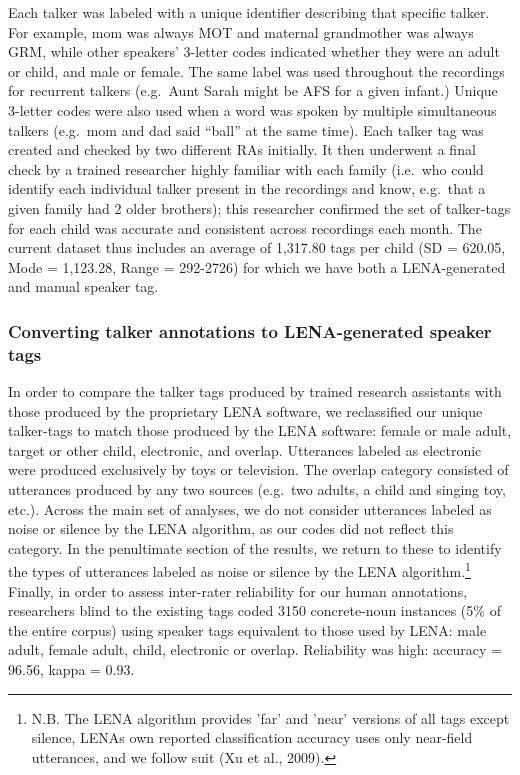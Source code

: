 \documentclass[man,floatsintext]{apa6}
\let\rmarkdownfootnote\footnote%
\def\footnote{\protect\rmarkdownfootnote}
\theoremstyle{definition}
\theoremstyle{definition}
\theoremstyle{definition}
\theoremstyle{remark}
\begin{document}
Each talker was labeled with a unique identifier describing that
specific talker. For example, mom was always MOT and maternal
grandmother was always GRM, while other speakers' 3-letter codes
indicated whether they were an adult or child, and male or female. The
same label was used throughout the recordings for recurrent talkers
(e.g.~Aunt Sarah might be AFS for a given infant.) Unique 3-letter codes
were also used when a word was spoken by multiple simultaneous talkers
(e.g.~mom and dad said \enquote{ball} at the same time). Each talker tag
was created and checked by two different RAs initially. It then
underwent a final check by a trained researcher highly familiar with
each family (i.e.~who could identify each individual talker present in
the recordings and know, e.g.~that a given family had 2 older brothers);
this researcher confirmed the set of talker-tags for each child was
accurate and consistent across recordings each month. The current
dataset thus includes an average of 1,317.80 tags per child (SD =
620.05, Mode = 1,123.28, Range = 292-2726) for which we have both a
LENA-generated and manual speaker tag.

\hypertarget{converting-talker-annotations-to-lena-generated-speaker-tags}{%
\subsubsection{Converting talker annotations to LENA-generated speaker
tags}\label{converting-talker-annotations-to-lena-generated-speaker-tags}}

In order to compare the talker tags produced by trained research
assistants with those produced by the proprietary LENA software, we
reclassified our unique talker-tags to match those produced by the LENA
software: female or male adult, target or other child, electronic, and
overlap. Utterances labeled as electronic were produced exclusively by
toys or television. The overlap category consisted of utterances
produced by any two sources (e.g.~two adults, a child and singing toy,
etc.). Across the main set of analyses, we do not consider utterances
labeled as noise or silence by the LENA algorithm, as our codes did not
reflect this category. In the penultimate section of the results, we
return to these to identify the types of utterances labeled as noise or
silence by the LENA
algorithm.\footnote{N.B. The LENA algorithm provides 'far' and 'near' versions of all tags except silence, LENAs own reported classification accuracy uses only near-field utterances, and we follow suit (Xu et al., 2009).}
Finally, in order to assess inter-rater reliability for our human
annotations, researchers blind to the existing tags coded 3150
concrete-noun instances (5\% of the entire corpus) using speaker tags
equivalent to those used by LENA: male adult, female adult, child,
electronic or overlap. Reliability was high: accuracy = 96.56, kappa =
0.93.
\end{document}
